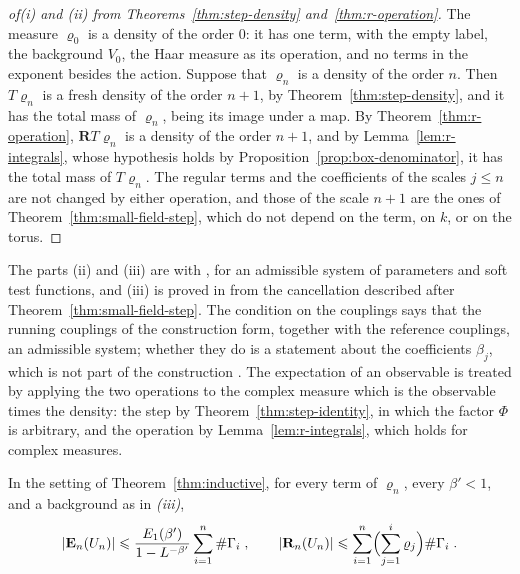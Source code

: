 \documentclass[11pt]{preprint}
\DeclarePairedDelimiter{\abs}{\lvert}{\rvert}
\numberwithin{equation}{section}
\begin{document}
\begin{proof}[of(i) and (ii) from Theorems~\ref{thm:step-density} and~\ref{thm:r-operation}]
The measure $\varrho_0$ is a density of the order $0$: it has one term, with the empty label, the background $V_0$, the Haar measure as its operation, and no terms in the exponent besides the action. Suppose that $\varrho_n$ is a density of the order $n$. Then $T\varrho_n$ is a fresh density of the order $n + 1$, by Theorem~\ref{thm:step-density}, and it has the total mass of $\varrho_n$, being its image under a map. By Theorem~\ref{thm:r-operation}, $\mathbf RT\varrho_n$ is a density of the order $n + 1$, and by Lemma~\ref{lem:r-integrals}, whose hypothesis holds by Proposition~\ref{prop:box-denominator}, it has the total mass of $T\varrho_n$. The regular terms and the coefficients of the scales $j \leqslant n$ are not changed by either operation, and those of the scale $n + 1$ are the ones of Theorem~\ref{thm:small-field-step}, which do not depend on the term, on $k$, or on the torus.
\end{proof}

The parts (ii) and (iii) are \cite[Theorems~1 and~2, pp.~262--263]{BalabanCRE} with \cite[Theorem~1, p.~355]{BalabanLFR2}, for an admissible system of parameters and soft test functions, and (iii) is proved in \cite[pp.~279--283]{BalabanCRE} from the cancellation described after Theorem~\ref{thm:small-field-step}. The condition on the couplings says that the running couplings of the construction form, together with the reference couplings, an admissible system; whether they do is a statement about the coefficients $\beta_j$, which is not part of the construction \cite[Theorem~2, p.~259]{BalabanRG1}. The expectation of an observable is treated by applying the two operations to the complex measure which is the observable times the density: the step by Theorem~\ref{thm:step-identity}, in which the factor $\Phi$ is arbitrary, and the operation by Lemma~\ref{lem:r-integrals}, which holds for complex measures.

\begin{corollary}\label{cor:totals}
In the setting of Theorem~\ref{thm:inductive}, for every term of $\varrho_n$, every $\beta' < 1$, and a background as in \emph{(iii)},
\begin{equation}\label{eq:totals}
    \abs{\mathbf E_n(U_n)} \leqslant \frac{E_1(\beta')}{1 - L^{-\beta'}}\sum_{i=1}^{n}\#\Gamma_i\;,
    \qquad
    \abs{\mathbf R_n(U_n)} \leqslant \sum_{i=1}^{n}\Bigl(\sum_{j=1}^{i}\varrho_j\Bigr)\#\Gamma_i\;.
\end{equation}
\end{corollary}
\end{document}
